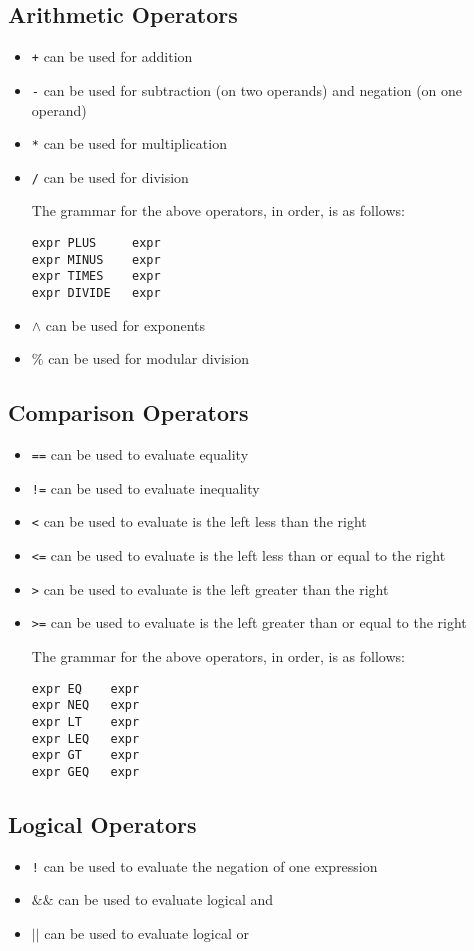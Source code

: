 \documentclass{article}
\begin{document}
\subsection{Arithmetic Operators}
\begin{itemize}
\item \texttt{+} can be used for addition
\item \texttt{-} can be used for subtraction (on two operands) and negation (on one operand)
\item \texttt{*} can be used for multiplication
\item \texttt{/} can be used for division

The grammar for the above operators, in order, is as follows:
\begin{Verbatim}[frame=single]
expr PLUS     expr
expr MINUS    expr
expr TIMES    expr
expr DIVIDE   expr
\end{Verbatim}
\item \texttt{$\wedge$} can be used for exponents
\item \texttt{$\%$} can be used for modular division
\end{itemize}

\subsection{Comparison Operators}
\begin{itemize}
\item \texttt{==} can be used to evaluate equality
\item \texttt{!=} can be used to evaluate inequality
\item \texttt{<} can be used to evaluate is the left less than the right
\item \texttt{<=} can be used to evaluate is the left less than or equal to the right
\item \texttt{>} can be used to evaluate is the left greater than the right
\item \texttt{>=} can be used to evaluate is the left greater than or equal to the right

The grammar for the above operators, in order, is as follows:
\begin{Verbatim}[frame=single]
expr EQ    expr
expr NEQ   expr
expr LT    expr
expr LEQ   expr
expr GT    expr
expr GEQ   expr
\end{Verbatim}
\end{itemize}

\subsection{Logical Operators}
\begin{itemize}
\item \texttt{!} can be used to evaluate the negation of one expression
\item \texttt{$\&\&$} can be used to evaluate logical and
\item \texttt{$\vert\vert$} can be used to evaluate logical or
\end{itemize}
\end{document}
